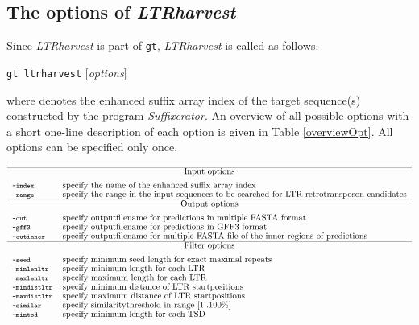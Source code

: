\documentclass[12pt,titlepage]{article}
\newcommand{\LTRharvest}{\textit{LTRharvest}\xspace}
\newcommand{\Suffixerator}{\textit{Suffixerator}\xspace}
\newcommand{\Gtltrharvest}{\texttt{gt ltrharvest}\xspace}
\newcommand{\Gt}{\texttt{gt}\xspace}
\begin{document}
\subsection{The options of \LTRharvest} \label{Overview}

Since \LTRharvest is part of \Gt, \LTRharvest is called as follows.

\Gtltrharvest {}  $[$\emph{options}$]$

where  denotes the enhanced suffix array index of
the target sequence(s) constructed by the program \Suffixerator.
An overview of all possible options with a short one-line description of
each option is given in Table \ref{overviewOpt}.
All options can be specified only once.

\begin{table}[htbp]
\caption{Overview of the \LTRharvest options sorted by categories.}
\begin{footnotesize}
\[
\renewcommand{\arraystretch}{0.89}
\begin{tabular}{ll}\hline
\Showoptiongroup{Input options}
\Showoption{index}& specify the name of the enhanced suffix array index
\\
\Showoption{range}& specify the range in the input sequences to be searched for
LTR retrotransposon candidates
\\
\Showoptiongroup{Output options}
\Showoption{out}& specify outputfilename for predictions in multiple FASTA
format
\\
\Showoption{gff3}& specify outputfilename for predictions in GFF3 format
\\
\Showoption{outinner}& specify outputfilename for multiple FASTA file
of the inner regions of predictions
\\
\Showoptiongroup{Filter options}
\Showoption{seed}& specify minimum seed length for exact maximal repeats
\\
\Showoption{minlenltr}& specify minimum length for each LTR
\\
\Showoption{maxlenltr}& specify maximum length for each LTR
\\
\Showoption{mindistltr}& specify minimum distance of LTR
startpositions
\\
\Showoption{maxdistltr}& specify maximum distance of LTR
startpositions
\\
\Showoption{similar}& specify similaritythreshold in range [1..100\%]
\\
\Showoption{mintsd}& specify minimum length for each TSD

\end{tabular}\]
\end{footnotesize}
\end{table}
\end{document}
